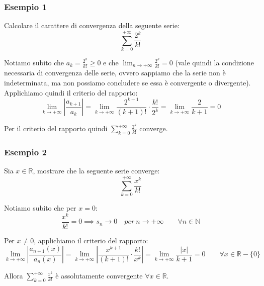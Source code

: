 \documentclass{article}
\begin{document}
\subsubsection{Esempio 1}
Calcolare il carattere di convergenza della seguente serie: 
\begin{equation*}
    \sum_{k = 0}^{+\infty} \frac{2^k}{k!}
\end{equation*}

\noindent Notiamo subito che $a_k = \frac{2^k}{k!} \geq 0$ e che $\lim_{n \to +\infty} \frac{2^k}{k!} = 0$ (vale quindi la condizione necessaria di convergenza delle serie, ovvero sappiamo che la serie non è indeterminata, ma non possiamo concludere se essa è convergente o divergente). Applichiamo quindi il criterio del rapporto:
\begin{equation*}
    \lim_{k \to +\infty} \left|\frac{a_{k + 1}}{a_k}\right| = \lim_{k \to +\infty} \frac{2^{k + 1}}{(k + 1)!} \cdot \frac{k!}{2^k} = \lim_{k \to +\infty} \frac{2}{k + 1} = 0
\end{equation*}

\noindent Per il criterio del rapporto quindi $\sum_{k = 0}^{+\infty} \frac{2^k}{k!}$ converge.

\subsubsection{Esempio 2}
Sia $x \in \mathbb{R}$, mostrare che la seguente serie converge:
\begin{equation*}
    \sum_{k = 0}^{+\infty} \frac{x^k}{k!}
\end{equation*}

\noindent Notiamo subito che per $x = 0$:
\begin{equation*}
    \frac{x^k}{k!} = 0 \implies s_n \to 0 \quad per \ n \to +\infty \qquad \forall n \in \mathbb{N}
\end{equation*}

\noindent Per $x \neq 0$, applichiamo il criterio del rapporto:
\begin{equation*}
    \lim_{k \to +\infty} \left|\frac{a_{n + 1}(x)}{a_n(x)}\right| = \lim_{k \to +\infty} \left|\frac{x^{k + 1}}{(k + 1)!} \cdot \frac{k!}{x^k}\right| = \lim_{k \to +\infty} \frac{|x|}{k + 1} = 0 \qquad \forall x \in \mathbb{R} - \{0\}
\end{equation*}

\noindent Allora $\sum_{k = 0}^{+\infty} \frac{x^k}{k!}$ è assolutamente convergente $\forall x \in \mathbb{R}$.\\
\end{document}
